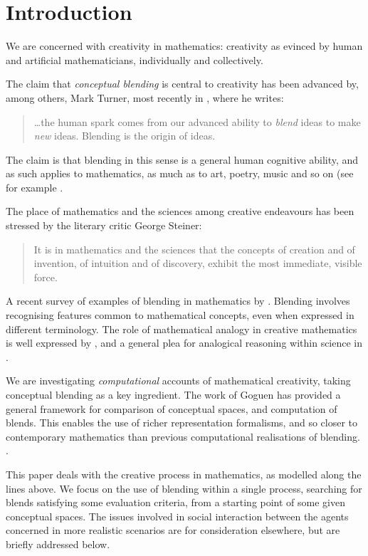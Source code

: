 \section{Introduction}
\label{sec:intro}

We are concerned with creativity in mathematics: creativity
as evinced by human and artificial mathematicians,
individually and collectively.

The claim that \emph{conceptual blending} is central to creativity
has been advanced by, among others, Mark Turner, most recently
in \textcite{MTurner14}, where he writes:
\begin{quote}
  \dots the human spark comes from our advanced ability to \emph{blend} ideas
  to make \emph{new} ideas. Blending is the origin of ideas.%
  \hfill \parencite[p 2]{MTurner14}
\end{quote}
The claim is that blending in this sense is a general human cognitive
ability, and as such applies to mathematics, as much as to art, poetry,
music and so on (see for example \textcite{MTurner05}.

The place of mathematics and the sciences among creative endeavours
has been stressed by the literary critic George Steiner:
\begin{quote}
  It is in mathematics and the sciences that the concepts of
creation and of invention, of intuition and of discovery,
exhibit the most immediate, visible force.
\end{quote}
A recent survey of examples of blending in mathematics by
\textcite{alexander11}.  Blending involves recognising features common
to mathematical concepts, even when expressed in different
terminology.  The role of mathematical analogy in creative mathematics
is well expressed by \textcite{Weil60}, and a general plea for
analogical reasoning within science in \cite{ArbibHesse86}.

We are investigating \emph{computational} accounts of mathematical
creativity, taking conceptual blending as a key ingredient.  The work
of Goguen \parencite{Gog99,Gog05,Gog05b} has provided a general framework for
comparison of conceptual spaces, and computation of blends.  This
enables the use of richer representation formalisms, and so closer to
contemporary mathematics than previous computational realisations of
blending. .

This paper deals with the creative process in mathematics, as modelled
along the lines above. We focus on the use of blending within a single
process, searching for blends satisfying some evaluation criteria,
from a starting point of some given conceptual spaces. The issues
involved in social interaction between the agents concerned in more
realistic scenarios are for consideration elsewhere, but are briefly
addressed below.

